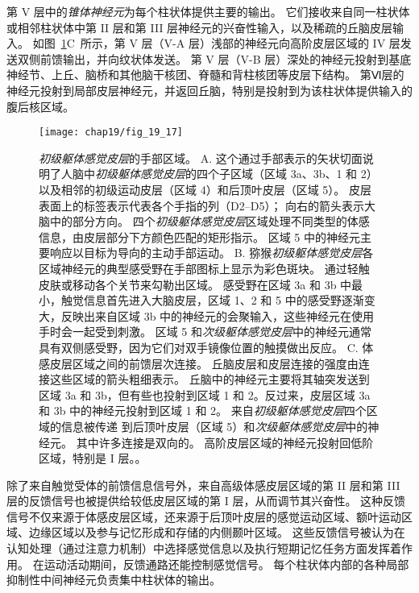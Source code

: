 第 V 层中的\textit{锥体神经元}为每个柱状体提供主要的输出。
它们接收来自同一柱状体或相邻柱状体中第 II 层和第 III 层神经元的兴奋性输入，以及稀疏的丘脑皮层输入。
如图~\ref{fig:19_17}C~所示，第 V 层（V-A 层）浅部的神经元向高阶皮层区域的 IV 层发送双侧前馈输出，并向纹状体发送。
第 V 层（V-B 层）深处的神经元投射到基底神经节、上丘、脑桥和其他脑干核团、脊髓和背柱核团等皮层下结构。
第Ⅵ层的神经元投射到局部皮层神经元，并返回丘脑，特别是投射到为该柱状体提供输入的腹后核区域。


\begin{figure}[htbp]
	\centering
	\texttt{[image: chap19/fig\_19\_17]}
	\caption{\textit{初级躯体感觉皮层}的手部区域。 
		A. 这个通过手部表示的矢状切面说明了人脑中\textit{初级躯体感觉皮层}的四个子区域（区域 3a、3b、1 和 2）以及相邻的初级运动皮层（区域 4）和后顶叶皮层（区域 5）。
		皮层表面上的标签表示代表各个手指的列（D2–D5）；
		向右的箭头表示大脑中的部分方向。
		四个\textit{初级躯体感觉皮层}区域处理不同类型的体感信息，由皮层部分下方颜色匹配的矩形指示。
		区域 5 中的神经元主要响应以目标为导向的主动手部运动。
		B. 猕猴\textit{初级躯体感觉皮层}各区域神经元的典型感受野在手部图标上显示为彩色斑块。
		通过轻触皮肤或移动各个关节来勾勒出区域。
		感受野在区域 3a 和 3b 中最小，触觉信息首先进入大脑皮层，区域 1、2 和 5 中的感受野逐渐变大，反映出来自区域 3b 中的神经元的会聚输入，这些神经元在使用手时会一起受到刺激。
		区域 5 和\textit{次级躯体感觉皮层}中的神经元通常具有双侧感受野，因为它们对双手镜像位置的触摸做出反应\cite{gardner1988somatosensory,iwamura1993rostrocaudal,iwamura1994bilateral}。
		C. 体感皮层区域之间的前馈层次连接。
		丘脑皮层和皮层连接的强度由连接这些区域的箭头粗细表示。
		丘脑中的神经元主要将其轴突发送到区域 3a 和 3b，但有些也投射到区域 1 和 2。反过来，皮层区域 3a 和 3b 中的神经元投射到区域 1 和 2。
		来自\textit{初级躯体感觉皮层}四个区域的信息被传递 到后顶叶皮层（区域 5）和\textit{次级躯体感觉皮层}中的神经元。
		其中许多连接是双向的。
		高阶皮层区域的神经元投射回低阶区域，特别是 I 层。\cite{felleman1991distributed}。}
	\label{fig:19_17}
\end{figure}


除了来自触觉受体的前馈信息信号外，来自高级体感皮层区域的第 II 层和第 III 层的反馈信号也被提供给较低皮层区域的第 I 层，从而调节其兴奋性。
这种反馈信号不仅来源于体感皮层区域，还来源于后顶叶皮层的感觉运动区域、额叶运动区域、边缘区域以及参与记忆形成和存储的内侧颞叶区域。
这些反馈信号被认为在认知处理（通过注意力机制）中选择感觉信息以及执行短期记忆任务方面发挥着作用。
在运动活动期间，反馈通路还能控制感觉信号。
每个柱状体内部的各种局部抑制性中间神经元负责集中柱状体的输出。



